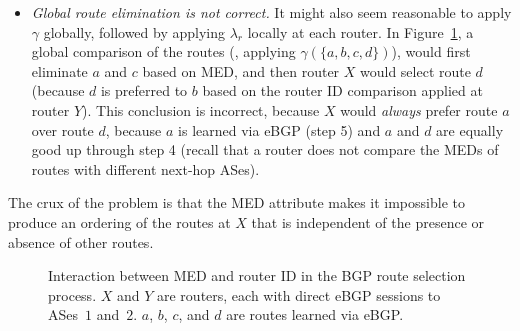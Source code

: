 \begin{itemize}

\item {\em Global route elimination is not correct.}
It might also seem reasonable to apply $\gamma$ globally, followed by
applying $\lambda_r$ locally at each router.
%
In Figure~\ref{fig:med}, a global comparison of 
the routes (\ie, applying $\gamma(\{a,b,c,d\})$), would first eliminate
$a$ and $c$ based on MED, and then   
router $X$ would select route $d$ (because $d$ is preferred to $b$ based on
the router ID comparison applied at router $Y$).   
This conclusion is
incorrect, because $X$ would {\em always\/} prefer route $a$ over route $d$,
because $a$ is learned via eBGP (step 5) and $a$ and $d$ are equally good
up through step 4 (recall that a router does not compare the MEDs of routes
with different next-hop ASes).
\end{itemize}

\noindent
The crux of the problem is that the MED attribute makes it impossible to
produce an ordering of the routes at $X$ that is independent of the
presence or absence of other routes.

\begin{figure}[t]
\begin{center}
\begin{psfrags}
\end{psfrags}
\end{center}
\caption[Interaction between MED and router ID in the BGP route selection
  process.]{Interaction between MED and router ID in the BGP route selection
  process.  $X$ and $Y$ are routers, each with direct eBGP sessions to
  ASes~$1$ and~$2$. $a$, $b$, $c$, and $d$ are routes learned via eBGP.}
\label{fig:med}
\end{figure}

